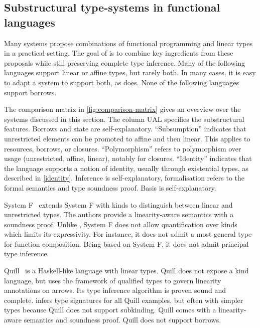 \subsection{Substructural type-systems in functional languages}

Many systems propose combinations of
functional programming and linear types in a practical setting.
The goal of \lang is to combine key ingredients
from these proposals while still preserving
complete type inference.
Many of the following languages support linear or affine types, but rarely
both. In many cases, it is easy to adapt a system to support both, as
\lang does.
None of the following languages support borrows.

The comparison matrix in \cref{fig:comparison-matrix} gives an
overview over the systems discussed in this section. The column UAL
specifies the substructural features. Borrows and state are
self-explanatory. ``Subsumption'' indicates that unrestricted elements
can be promoted to affine and then linear. This applies to resources,
borrows, or closures. ``Polymorphism'' refers to polymorphism over
usage (unrestricted, affine, linear), notably for closures.
``Identity'' indicates that the language supports a notion
of identity, usually through existential types, as described in
\cref{identity}.
Inference is self-explanatory, formalisation
refers to the formal semantics and type soundness proof. Basis is self-explanatory.

System F\degree~\citep{DBLP:conf/tldi/MazurakZZ10}
extends System F with kinds to distinguish
between linear and unrestricted types.
The authors provide
a linearity-aware semantics with a soundness proof.
Unlike \lang, System F\degree{} does not allow
quantification over kinds which limits its expressivity. For instance, it
does not admit a most general type for function composition.
Being based on System F, it does not admit
principal type inference.

Quill~\citep{DBLP:conf/icfp/Morris16} is a Haskell-like language with linear
types.
Quill does not expose a kind language, but
uses the framework of qualified types to govern linearity annotations on arrows.
Its type inference algorithm is proven sound and complete.
\lang infers type signatures for all Quill examples, but often with
simpler types because Quill does not support subkinding.
Quill comes with a linearity-aware semantics and soundness proof.
Quill does not support borrows.


